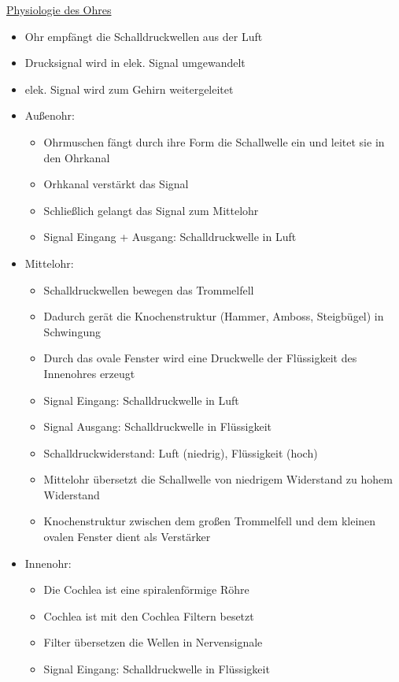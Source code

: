 \documentclass[a4paper,10pt,oneside]{article}
\begin{document}
\underline{Physiologie des Ohres} \\
	\begin{itemize}
		\item Ohr empfängt die Schalldruckwellen aus der Luft
		\item Drucksignal wird in elek. Signal umgewandelt
		\item elek. Signal wird zum Gehirn weitergeleitet
		\item Außenohr:
			\begin{itemize}
				\item Ohrmuschen fängt durch ihre Form die Schallwelle ein und leitet sie in den Ohrkanal
				\item Orhkanal verstärkt das Signal
				\item Schließlich gelangt das Signal zum Mittelohr
				\item Signal Eingang + Ausgang: Schalldruckwelle in Luft
			\end{itemize}
		\item Mittelohr: 
			\begin{itemize}
				\item Schalldruckwellen bewegen das Trommelfell
				\item Dadurch gerät die Knochenstruktur (Hammer, Amboss, Steigbügel) in Schwingung 
				\item Durch das ovale Fenster wird eine Druckwelle der Flüssigkeit des Innenohres erzeugt
				\item Signal Eingang: Schalldruckwelle in Luft
				\item Signal Ausgang: Schalldruckwelle in Flüssigkeit
				\item Schalldruckwiderstand: Luft (niedrig), Flüssigkeit (hoch)
				\item Mittelohr übersetzt die Schallwelle von niedrigem Widerstand zu hohem Widerstand
				\item Knochenstruktur zwischen dem großen Trommelfell und dem kleinen ovalen Fenster dient als Verstärker
			\end{itemize}
		\item Innenohr:
			\begin{itemize}
				\item Die Cochlea ist eine spiralenförmige Röhre 
				\item Cochlea ist mit den Cochlea Filtern besetzt 
				\item Filter übersetzen die Wellen in Nervensignale
				\item Signal Eingang: Schalldruckwelle in Flüssigkeit

\end{itemize}
\end{itemize}
\end{document}
